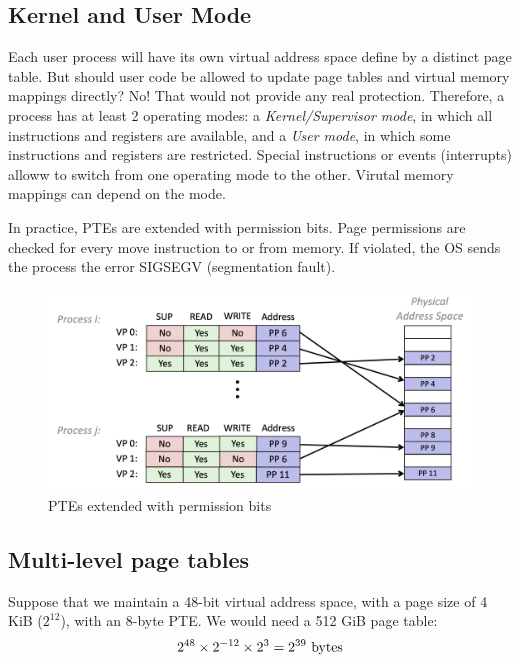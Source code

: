 \documentclass[toc]{../cs-classes/cs-classes}
\begin{document}
\subsection{Kernel and User Mode}
Each user process will have its own virtual address space define by a distinct page table. But should user code be allowed to update page tables and virtual memory mappings directly? No! That would not provide any real protection. Therefore, a process has at least 2 operating modes: a \emph{Kernel/Supervisor mode}, in which all instructions and registers are available, and a \emph{User mode}, in which some instructions and registers are restricted. Special instructions or events (interrupts) alloww to switch from one operating mode to the other. Virutal memory mappings can depend on the mode.

In practice, PTEs are extended with permission bits. Page permissions are checked for every move instruction to or from memory. If violated, the OS sends the process the error SIGSEGV (segmentation fault).
\begin{figure}[H]
    \centering
    \includegraphics[scale=0.3]{images/PTEs-permissions.png}
    \caption{PTEs extended with permission bits}
\end{figure}

\subsection{Multi-level page tables}
Suppose that we maintain a 48-bit virtual address space, with a page size of 4 KiB ($2^{12}$), with an 8-byte PTE. We would need a 512 GiB page table:
\begin{equation*}
    2^{48} \times 2^{-12} \times 2^3 = 2^{39} \textnormal{ bytes}
\end{equation*}
\end{document}
